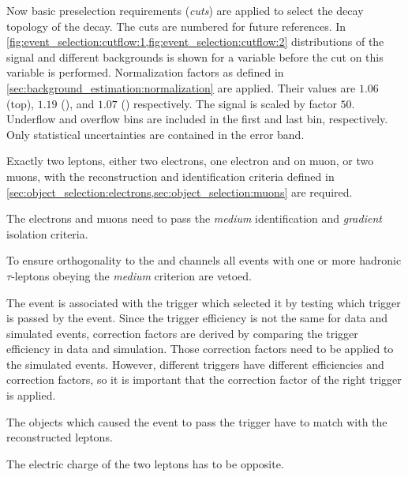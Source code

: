Now basic preselection requirements (\emph{cuts}) are applied to select the decay topology of the \Httll{} decay.
The cuts are numbered for future references.
In \cref{fig:event_selection:cutflow:1,fig:event_selection:cutflow:2}
distributions of the signal and different backgrounds is shown for a variable before the cut on this variable is performed.
Normalization factors as defined in \cref{sec:background_estimation:normalization} are applied.
Their values are $1.06$ (top), $1.19$ (\Zll), and $1.07$ (\Ztautau) respectively.
The signal is scaled by factor $50$.
Underflow and overflow bins are included in the first and last bin, respectively.
Only statistical uncertainties are contained in the error band.
\begin{description}[style=nextline,leftmargin=1cm]
    \item[\ \,(1) Number of leptons]
        Exactly two leptons, either two electrons, one electron and on muon, or two muons, with the reconstruction
        and identification criteria defined in \cref{sec:object_selection:electrons,sec:object_selection:muons} are required.
    \item[\ \,(2) Lepton identification and isolation criteria]
        The electrons and muons need to pass the \emph{medium} identification and \emph{gradient} isolation criteria.
    \item[\ \,(3) Hadronic tau veto]
        To ensure orthogonality to the \Httlh{} and \Htthh{} channels all events with one or more hadronic $\tau$-leptons
        obeying the \emph{medium} criterion are vetoed.
    \item[\ \,(4) Trigger]
        The event is associated with the trigger which selected it by testing which trigger is passed by the event.
        Since the trigger efficiency is not the same for data and simulated events, correction factors
        are derived by comparing the trigger efficiency in data and simulation.
        Those correction factors need to be applied to the simulated events.
        However, different triggers have different efficiencies and correction factors, so it is important that the
        correction factor of the right trigger is applied.
    \item[\ \,(5) Trigger matching]
        The objects which caused the event to pass the trigger have to match with the reconstructed leptons.
    \item[\ \,(6) Opposite sign]
        The electric charge of the two leptons has to be opposite.
    \item[\ \,(7) Dilepton mass]

\end{description}
